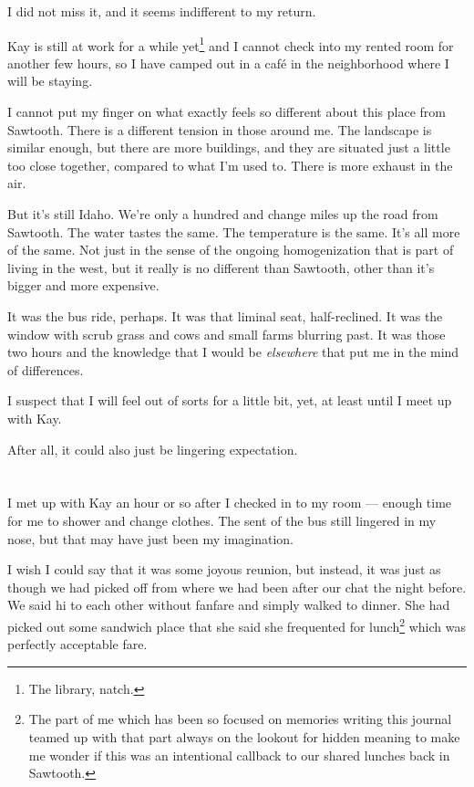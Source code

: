 I did not miss it, and it seems indifferent to my return.

Kay is still at work for a while yet\footnote{The library, natch.} and I cannot check into my rented room for another few hours, so I have camped out in a café in the neighborhood where I will be staying.

I cannot put my finger on what exactly feels so different about this place from Sawtooth. There is a different tension in those around me. The landscape is similar enough, but there are more buildings, and they are situated just a little too close together, compared to what I'm used to. There is more exhaust in the air.

But it's still Idaho. We're only a hundred and change miles up the road from Sawtooth. The water tastes the same. The temperature is the same. It's all more of the same. Not just in the sense of the ongoing homogenization that is part of living in the west, but it really is no different than Sawtooth, other than it's bigger and more expensive.

It was the bus ride, perhaps. It was that liminal seat, half-reclined. It was the window with scrub grass and cows and small farms blurring past. It was those two hours and the knowledge that I would be \emph{elsewhere} that put me in the mind of differences.

I suspect that I will feel out of sorts for a little bit, yet, at least until I meet up with Kay.

After all, it could also just be lingering expectation.

\section{}

I met up with Kay an hour or so after I checked in to my room --- enough time for me to shower and change clothes. The sent of the bus still lingered in my nose, but that may have just been my imagination.

I wish I could say that it was some joyous reunion, but instead, it was just as though we had picked off from where we had been after our chat the night before. We said hi to each other without fanfare and simply walked to dinner. She had picked out some sandwich place that she said she frequented for lunch\footnote{The part of me which has been so focused on memories writing this journal teamed up with that part always on the lookout for hidden meaning to make me wonder if this was an intentional callback to our shared lunches back in Sawtooth.} which was perfectly acceptable fare.

